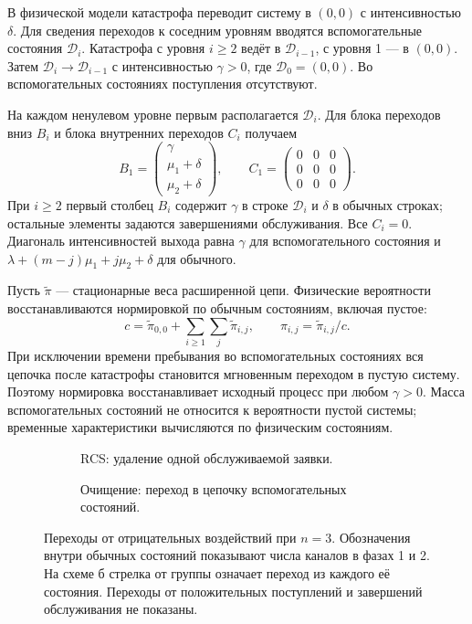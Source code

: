 В физической модели катастрофа переводит систему в \((0,0)\) с интенсивностью \(\delta\). Для сведения переходов к соседним уровням вводятся вспомогательные состояния \(\mathcal D_i\). Катастрофа с уровня \(i\ge2\) ведёт в \(\mathcal D_{i-1}\), с уровня 1 --- в \((0,0)\). Затем \(\mathcal D_i\to\mathcal D_{i-1}\) с интенсивностью \(\gamma>0\), где \(\mathcal D_0=(0,0)\). Во вспомогательных состояниях поступления отсутствуют.

На каждом ненулевом уровне первым располагается \(\mathcal D_i\). Для блока переходов вниз \(B_i\) и блока внутренних переходов \(C_i\) получаем
\[
B_1=\begin{pmatrix}\gamma\\\mu_1+\delta\\\mu_2+\delta\end{pmatrix},\qquad
C_1=\begin{pmatrix}0&0&0\\0&0&0\\0&0&0\end{pmatrix}.
\]
При \(i\ge2\) первый столбец \(B_i\) содержит \(\gamma\) в строке \(\mathcal D_i\) и \(\delta\) в обычных строках; остальные элементы задаются завершениями обслуживания. Все \(C_i=0\). Диагональ интенсивностей выхода равна \(\gamma\) для вспомогательного состояния и \(\lambda+(m-j)\mu_1+j\mu_2+\delta\) для обычного.

Пусть \(\widetilde\pi\) --- стационарные веса расширенной цепи. Физические вероятности восстанавливаются нормировкой по обычным состояниям, включая пустое:
\[
c=\widetilde\pi_{0,0}+\sum_{i\ge1}\sum_j\widetilde\pi_{i,j},\qquad
\pi_{i,j}=\widetilde\pi_{i,j}/c.
\]
При исключении времени пребывания во вспомогательных состояниях вся цепочка после катастрофы становится мгновенным переходом в пустую систему. Поэтому нормировка восстанавливает исходный процесс при любом \(\gamma>0\). Масса вспомогательных состояний не относится к вероятности пустой системы; временные характеристики вычисляются по физическим состояниям.

\begin{figure}[!htbp]
\centering
\begin{subfigure}[t]{0.98\linewidth}
\centering
{}
\caption{RCS: удаление одной обслуживаемой заявки.}
\label{fig:rcs_transitions}
\end{subfigure}

\begin{subfigure}[t]{0.98\linewidth}
\centering
{}
\caption{Очищение: переход в цепочку вспомогательных состояний.}
\label{fig:disaster_transitions}
\end{subfigure}
\caption{Переходы от отрицательных воздействий при \(n=3\). Обозначения внутри обычных состояний показывают числа каналов в фазах 1 и 2. На схеме б стрелка от группы означает переход из каждого её состояния. Переходы от положительных поступлений и завершений обслуживания не показаны.}
\label{fig:negative_transitions}
\end{figure}



